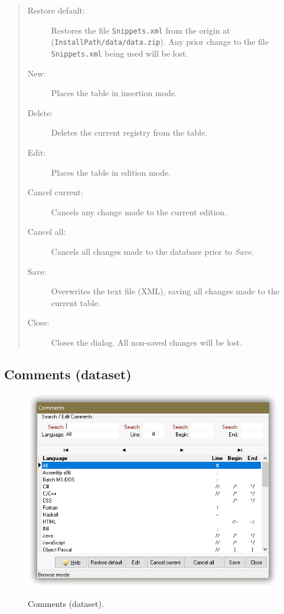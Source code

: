 \begin{quote}
  \begin{footnotesize}
    \begin{description}
      \item[Restore default:]
        Restores the file \texttt{Snippets.xml} from the origin at
        (\texttt{InstallPath/data/data.zip}). Any prior change to the file
        \texttt{Snippets.xml} being used will be lost.
      \item[New:]
        Places the table in insertion mode.
      \item[Delete:]
        Deletes the current registry from the table.
      \item[Edit:]
        Places the table in edition mode.
      \item[Cancel current:]
        Cancels any change made to the current edition.
      \item[Cancel all:]
        Cancels all changes made to the database prior to \textit{Save}.
      \item[Save:]
        Overwrites the text file (XML), saving all changes made to the current table.
      \item[Close:]
        Closes the dialog. All non-saved changes will be lost.
    \end{description}
  \end{footnotesize}
\end{quote}


\subsection{Comments (dataset)}

\begin{figure}[H]
  \includegraphics[scale=0.8]{./res/dlg_comments.png}\\
  \caption{Comments (dataset).}
  \label{fig:dlg_comments}
\end{figure}

